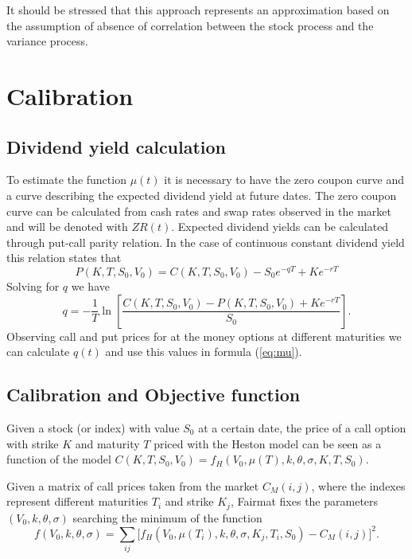 It should be stressed that this approach represents an approximation based on the assumption of absence of correlation between the stock process and the variance process. 









\section{Calibration}

\subsection{Dividend yield calculation}

To estimate the function $\mu(t)$ it is necessary to have the zero coupon curve and a curve describing the expected dividend yield at future dates. The zero coupon curve can be calculated from cash rates and swap rates observed in the market and will be denoted with $ZR(t)$. Expected dividend yields can be calculated through put-call parity relation. In the case of continuous constant dividend yield this relation states that
\begin{equation}
P(K, T, S_0, V_0) = C(K, T, S_0, V_0)  - S_0 e^{-qT} + Ke^{-rT}
\end{equation}
Solving for $q$ we have
\begin{equation}
q = -\frac{1}{T}\ln\left[\frac{C(K, T, S_0, V_0)-P(K, T, S_0, V_0) + Ke^{-rT}}{S_0}\right].
\end{equation}
Observing call and put prices for at the money options at different maturities we can calculate $q(t)$ and use this values in formula (\ref{eq:mu}).

\subsection{Calibration and Objective function}

Given a stock (or index) with value $S_0$ at a certain date, the price of a call option with strike $K$ and maturity $T$ priced with the Heston model can be seen as a function of the model $C(K,T,S_0, V_0) = f_H(V_0, \mu(T), k, \theta, \sigma, K, T, S_0)$.

Given a matrix of call prices taken from the market $C_M(i,j)$, where the indexes represent different maturities $T_i$ and strike $K_j$, Fairmat fixes the parameters $(V_0, k, \theta, \sigma)$ searching the minimum of the function
\begin{equation}
f(V_0, k, \theta, \sigma) = \sum_{ij}\Big[f_H(V_0, \mu(T_i), k, \theta, \sigma, K_j, T_i, S_0) - C_M(i,j)\Big]^2.
\end{equation}

